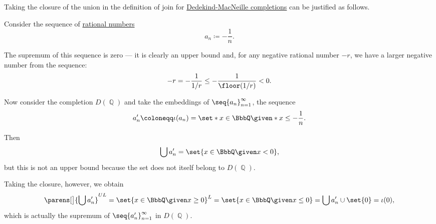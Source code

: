 \begin{example}\label{ex:dedekind_macnielle_join_closure}
  Taking the closure of the union in the definition of join for \hyperref[def:dedekind_macnielle_completion]{Dedekind-MacNeille completions} can be justified as follows.

  Consider the sequence of \hyperref[def:rational_numbers]{rational numbers}
  \begin{equation*}
    a_n \coloneqq -\frac 1 n.
  \end{equation*}

  The supremum of this sequence is zero --- it is clearly an upper bound and, for any negative rational number \( -r \), we have a larger negative number from the sequence:
  \begin{equation*}
    -r
    =
    -\frac 1 {1 / r}
    \leq
    -\frac 1 {\floor(1 / r)}
    <
    0.
  \end{equation*}

  Now consider the completion \( D(\BbbQ) \) and take the embeddings of \( \seq{ a_n }_{n=1}^\infty \), the sequence
  \begin{equation*}
    a_n' \coloneqq \iota(a_n) = \set*{ x \in \BbbQ \given* x \leq -\frac 1 n }.
  \end{equation*}

  Then
  \begin{equation*}
    \bigcup a_n' = \set{ x \in \BbbQ \given x < 0 },
  \end{equation*}
  but this is not an upper bound because the set does not itself belong to \( D(\BbbQ) \).

  Taking the closure, however, we obtain
  \begin{equation*}
    \parens[\big]{ \bigcup a_n' }^{UL}
    =
    \set{ x \in \BbbQ \given x \geq 0 }^L
    =
    \set{ x \in \BbbQ \given x \leq 0 }
    =
    \bigcup a_n' \cup \set{ 0 }
    =
    \iota(0),
  \end{equation*}
  which is actually the supremum of \( \seq{ a_n' }_{n=1}^\infty \) in \( D(\BbbQ) \).
\end{example}


